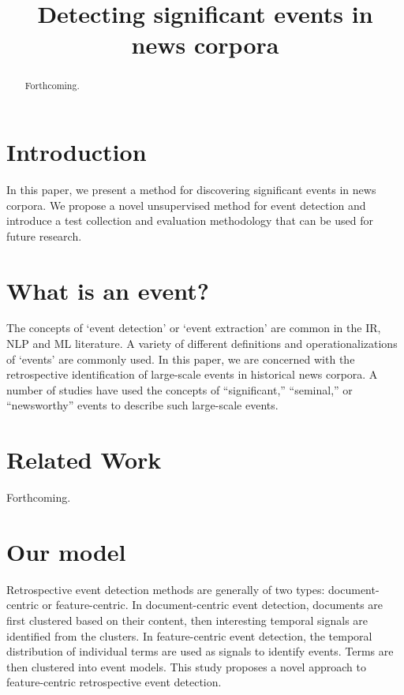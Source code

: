 \documentclass{sig-alternate}
\begin{document}
%

\title{Detecting significant events in news corpora}

\maketitle
\begin{abstract}
Forthcoming.
\end{abstract}


\terms{}


\section{Introduction}

In this paper, we present a method for discovering significant events in news corpora. We propose a novel unsupervised method for event detection
and introduce a test collection and evaluation methodology that can be used for future research.

\section{What is an event?}

The concepts of `event detection' or `event extraction' are common in the IR, NLP and ML literature. A variety of different definitions and operationalizations of `events' are commonly used.  In this paper, we are concerned with the retrospective identification of large-scale events in historical news corpora. A number of studies have used the concepts of ``significant,'' ``seminal,'' or ``newsworthy'' events to describe such large-scale events.

\section{Related Work}

Forthcoming.

\section{Our model}

Retrospective event detection methods are generally of two types: document-centric or feature-centric.  In document-centric event detection, documents are first clustered based on their content, then interesting temporal signals are identified from the clusters.  In feature-centric event detection, the temporal distribution of individual terms are used as signals to identify events. Terms are then clustered into event models.  This study proposes a novel approach to feature-centric retrospective event detection.
\end{document}
